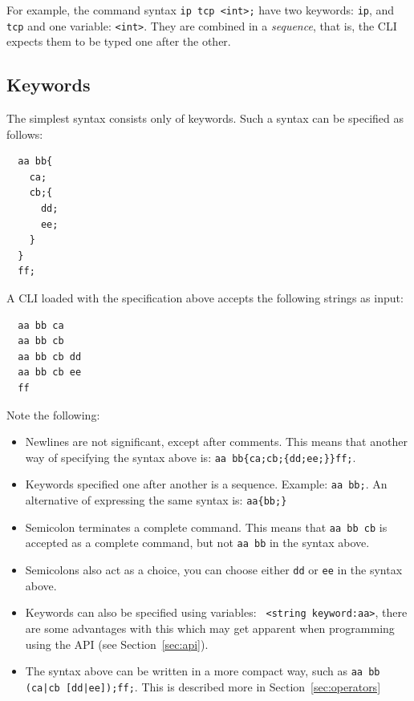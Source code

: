 \documentclass[a4paper, 10pt] {article}
\begin{document}
For example, the command syntax {\tt ip tcp <int>;} have two keywords:
{\tt ip}, and {\tt tcp} and one variable: {\tt <int>}. They are
combined in a \emph{sequence}, that is, the CLI expects them to be
typed one after the other.

\subsection{Keywords}

The simplest syntax consists only of keywords. Such a syntax can be
specified as follows:
\begin{verbatim}
  aa bb{
    ca;
    cb;{
      dd;
      ee;
    }
  }
  ff;
\end{verbatim}
A CLI loaded with the specification above accepts the following strings as input:
\begin{verbatim}
  aa bb ca
  aa bb cb
  aa bb cb dd
  aa bb cb ee
  ff
\end{verbatim}
Note the following:
\begin{itemize}

\item Newlines are not significant, except after comments. This means
  that another way of specifying the syntax above is: {\tt aa
    bb\{ca;cb;\{dd;ee;\}\}ff;}.

\item Keywords specified one after another is a
  sequence. Example: {\tt aa bb;}. An alternative of expressing the same syntax is: {\tt aa\{bb;\}}

\item Semicolon terminates a complete command. This means that {\tt aa bb cb}
 is accepted as a complete command, but not {\tt aa bb} in the syntax above.

\item Semicolons also act as a choice, you can choose either {\tt dd}
  or {\tt ee} in the syntax above.

\item Keywords can also be specified using variables: {\tt
  <string keyword:aa>}, there are some advantages with this which may
  get apparent when programming using the API (see
  Section~\ref{sec:api}).

\item The syntax above can be written in a more compact way, such as {\tt aa bb (ca|cb [dd|ee]);ff;}. This is described more in Section~\ref{sec:operators}

\end{itemize}
\end{document}
